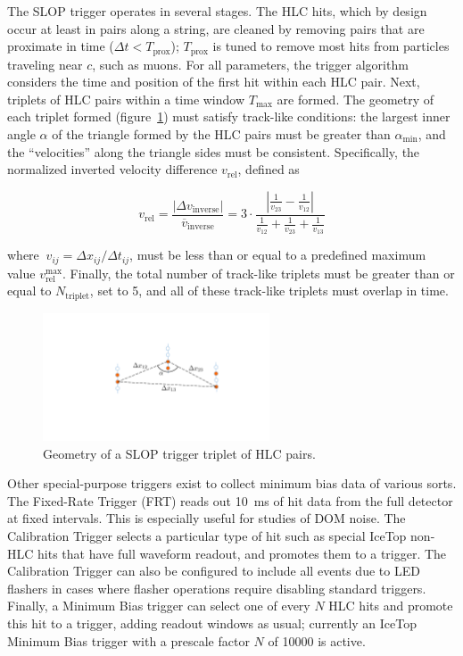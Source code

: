 The SLOP trigger operates in several stages.  The HLC hits, which by design
occur at least in pairs along a string, are cleaned by removing pairs that
are proximate in time ($\Delta t < T_{\mathrm{prox}}$); $T_{\mathrm{prox}}$
is tuned to remove most hits from particles traveling near $c$, such as muons.
For all parameters, the trigger algorithm considers the time and 
position of the first hit within each HLC pair.  Next, triplets of HLC
pairs within a time window $T_{\mathrm{max}}$ 
are formed.  The geometry of each triplet formed (figure~\ref{fig:slop})
must satisfy track-like 
conditions: the largest inner angle $\alpha$ of the triangle formed by the
HLC pairs must be greater than $\alpha_{\mathrm{min}}$, and the
``velocities'' along the triangle sides must be consistent.  Specifically,
the normalized inverted velocity difference $v_\mathrm{rel}$, defined as

\begin{equation}
  v_\mathrm{rel}=\frac{|\Delta
  v_\mathrm{inverse}|}{\overline{v}_\mathrm{inverse}} = 
  3\cdot\frac{|\frac{1}{v_{23}}-\frac{1}{v_{12}}|}
  {\frac{1}{v_{12}}+\frac{1}{v_{23}}+\frac{1}{v_{13}}}
\end{equation}

\noindent where $\ v_{ij} = \Delta x_{ij}/\Delta t_{ij}$, must be less than
or equal to a predefined maximum value
$v_{\mathrm{rel}}^{\mathrm{max}}$.  Finally, the total number of track-like triplets
must be greater than or equal to $N_{\mathrm{triplet}}$, set to 5, and all
of these track-like triplets must overlap in time.  

\begin{figure}[!ht]
 \centering
 \includegraphics[width=0.6\textwidth]{graphics/online/trigger/slop.pdf}
 \caption{Geometry of a SLOP trigger triplet of HLC pairs.}
 \label{fig:slop}
\end{figure}

Other special-purpose triggers exist to collect minimum bias data of
various sorts.  The Fixed-Rate Trigger (FRT) reads out 10~ms of hit data from
the full detector at fixed intervals.  This is especially useful for studies
of DOM noise.  The Calibration Trigger selects a particular type of hit
such as special IceTop non-HLC hits that have full waveform readout, and promotes
them to a trigger. The Calibration Trigger can also be configured to
include all events due to LED flashers in cases where flasher 
operations require disabling standard triggers. Finally, a Minimum Bias
trigger can select one of every $N$ HLC hits and promote this hit to a trigger, adding
readout windows as usual; currently an IceTop Minimum Bias trigger with a
prescale factor $N$ of 10000 is active.

